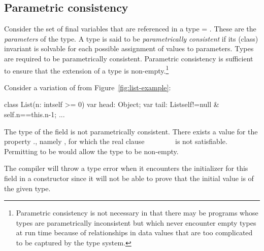 
\subsection{Parametric consistency}

Consider the set of final variables that are referenced in a type
 = . These are the {\em parameters} of the type. A
type is said to be {\em parametrically consistent} if its
(class)
invariant
 is solvable for each possible assignment of values to
parameters.  Types are required to be parametrically
consistent. Parametric consistency is sufficient to ensure that the
extension of a type is non-empty.\footnote{Parametric
consistency is not necessary in that
there may be programs whose types are parametrically inconsistent
but which never encounter empty types at run time because of
relationships in data values that are too complicated to be captured by
the type system.}

Consider a variation of  from Figure~\ref{fig:list-example}:
\begin{xten}
class List(n: int{self >= 0}) {
  var head: Object;
  var tail: List{self!=null &
                 self.n==this.n-1};
  ...
}
\end{xten}
The type of the field  is not parametrically
consistent. There exists a value for the property ., namely
, for which the real clause ~\xcd{!=}~ \xcd{&}
~\xcd{==}~ \xcd{&}
~\xcd{>=}~ is not satisfiable.  Permitting
 to be  would allow the type to be non-empty.

The compiler will throw a type error when it encounters the
initializer for this field in a constructor since it will not be able
to prove that the initial value is of the given type.


